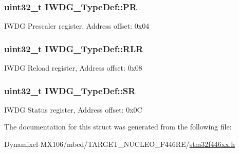 \subsubsection[{\texorpdfstring{PR}{PR}}]{ uint32\+\_\+t I\+W\+D\+G\+\_\+\+Type\+Def\+::\+PR}\hypertarget{struct_i_w_d_g___type_def_a5f2717885ff171e686e0347af9e6b68d}{}\label{struct_i_w_d_g___type_def_a5f2717885ff171e686e0347af9e6b68d}
I\+W\+DG Prescaler register, Address offset\+: 0x04 
\subsubsection[{\texorpdfstring{R\+LR}{RLR}}]{ uint32\+\_\+t I\+W\+D\+G\+\_\+\+Type\+Def\+::\+R\+LR}\hypertarget{struct_i_w_d_g___type_def_aa3703eaa40e447dcacc69c0827595532}{}\label{struct_i_w_d_g___type_def_aa3703eaa40e447dcacc69c0827595532}
I\+W\+DG Reload register, Address offset\+: 0x08 
\subsubsection[{\texorpdfstring{SR}{SR}}]{ uint32\+\_\+t I\+W\+D\+G\+\_\+\+Type\+Def\+::\+SR}\hypertarget{struct_i_w_d_g___type_def_a9bbfbe921f2acfaf58251849bd0a511c}{}\label{struct_i_w_d_g___type_def_a9bbfbe921f2acfaf58251849bd0a511c}
I\+W\+DG Status register, Address offset\+: 0x0C 

The documentation for this struct was generated from the following file\+:\begin{DoxyCompactItemize}
\item 
Dynamixel-\/\+M\+X106/mbed/\+T\+A\+R\+G\+E\+T\+\_\+\+N\+U\+C\+L\+E\+O\+\_\+\+F446\+R\+E/\hyperlink{stm32f446xx_8h}{stm32f446xx.\+h}\end{DoxyCompactItemize}
